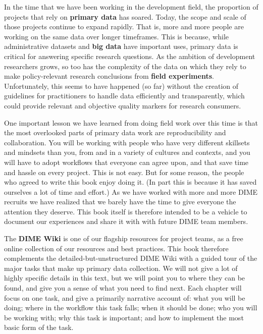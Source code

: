 In the time that we have been working in the development field,
the proportion of projects that rely on \textbf{primary data} has soared.\cite{angrist2017economic}
Today, the scope and scale of those projects continue to expand rapidly.
That is, more and more people are working on the same data over longer timeframes.
This is because, while administrative datasets
and \textbf{big data} have important uses,
primary data
is critical for answering specific research questions.\cite{levitt2009field}
As the ambition of development researchers grows, so too has the complexity of the data
on which they rely to make policy-relevant research conclusions from \textbf{field experiments}.
Unfortunately, this seems to have happened (so far) without the creation of
guidelines for practitioners to handle data efficiently and transparently,
which could provide relevant and objective quality markers for research consumers.

One important lesson we have learned from doing field work over this time is that
the most overlooked parts of primary data work are reproducibility and collaboration.
You will be working with people
who have very different skillsets and mindsets than you,
from and in a variety of cultures and contexts, and you will have to adopt workflows
that everyone can agree upon, and that save time and hassle on every project.
This is not easy. But for some reason, the people who agreed to write this book enjoy doing it.
(In part this is because it has saved ourselves a lot of time and effort.)
As we have worked with more and more DIME recruits
we have realized that we barely have the time to give everyone the attention they deserve.
This book itself is therefore intended to be a vehicle to document our experiences and share it with with future DIME team members.

The \textbf{DIME Wiki} is one of our flagship resources for project teams,
as a free online collection of our resources and best practices.
This book therefore complements the detailed-but-unstructured DIME Wiki
with a guided tour of the major tasks that make up primary data collection.
We will not give a lot of highly specific details in this text,
but we will point you to where they can be found,
and give you a sense of what you need to find next.
Each chapter will focus on one task,
and give a primarily narrative account of:
what you will be doing; where in the workflow this task falls;
when it should be done; who you will be working with;
why this task is important; and how to implement the most basic form of the task.

